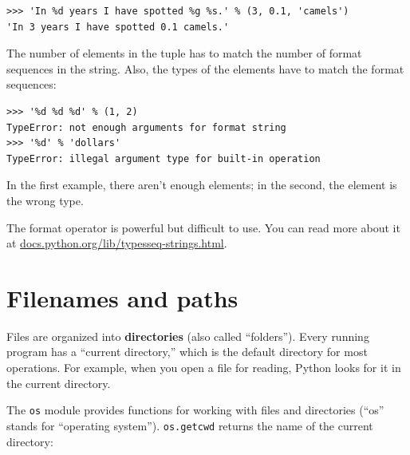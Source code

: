 \documentclass[10pt]{book}
\begin{document}
\beforeverb
\begin{verbatim}
>>> 'In %d years I have spotted %g %s.' % (3, 0.1, 'camels')
'In 3 years I have spotted 0.1 camels.'
\end{verbatim}
\afterverb
%
The number of elements in the tuple has to match the number
of format sequences in the string.  Also, the types of the
elements have to match the format sequences:


\beforeverb
\begin{verbatim}
>>> '%d %d %d' % (1, 2)
TypeError: not enough arguments for format string
>>> '%d' % 'dollars'
TypeError: illegal argument type for built-in operation
\end{verbatim}
\afterverb
%
In the first example, there aren't enough elements; in the
second, the element is the wrong type.

The format operator is powerful but difficult to use.  You can
read more about it at \url{docs.python.org/lib/typesseq-strings.html}.




\section{Filenames and paths}
\label{paths}


Files are organized into {\bf directories} (also called ``folders'').
Every running program has a ``current directory,'' which is the
default directory for most operations.  
For example, when you open a file for reading, Python looks for it in the
current directory.


The {\tt os} module provides functions for working with files and
directories (``os'' stands for ``operating system'').  {\tt os.getcwd}
returns the name of the current directory:
\end{document}
